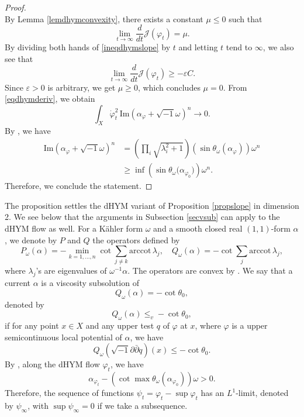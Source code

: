 \documentclass{amsart}
\numberwithin{equation}{section}
\theoremstyle{plain}
\theoremstyle{definition}
\theoremstyle{remark}
\newcommand{\delb}{\sqrt{-1}\partial\bar{\partial}}
\begin{document}
\begin{proof}
\begin{equation}
    \end{equation}
    By Lemma \ref{lemdhymconvexity}, there exists a constant $\mu\le0$ such that
    $$\lim_{t\rightarrow\infty}\frac{d}{dt}\mathcal{J}(\varphi_t)=\mu.$$
    By dividing both hands of \eqref{ineqdhymslope} by $t$ and letting $t$ tend to $\infty$, we also see that
    $$\lim_{t\rightarrow\infty}\frac{d}{dt}\mathcal{J}(\varphi_t)\ge - \varepsilon C.$$
    Since $\varepsilon>0$ is arbitrary, we get $\mu\ge0$, which concludes $\mu=0$. From \eqref{eqdhymderiv}, we obtain
    $$\int_X \dot{\varphi}_t^2 \, \mathrm{Im}(\alpha_\varphi+\sqrt{-1}\omega)^n \rightarrow0.$$
    By \cite[Lemma 3.2]{FYZ}, we have
    \begin{align*}
        \mathrm{Im}(\alpha_\varphi+\sqrt{-1}\omega)^n
        &=\left(\prod_i\sqrt{\lambda_i^2+1}\right)\left(\sin{\theta_\omega(\alpha_\varphi)}\right)\omega^n\\
        &\ge \inf\left(\sin{\theta_\omega(\alpha_{\varphi_0}})\right) \omega^n.
    \end{align*}    
    Therefore, we conclude the statement.
\end{proof}

The proposition settles the dHYM variant of Proposition \ref{propslope} in dimension 2. We see below that the arguments in Subsection \ref{secvsub} can apply to the dHYM flow as well. 
For a K{\"a}hler form $\omega$ and a smooth closed real $(1,1)$-form $\alpha$, we denote by $P$ and $Q$ the operators defined by
$$P_\omega(\alpha)=-\min_{k=1,\dots,n}\cot{\sum_{j\neq k}\mathrm{arccot}\, {\lambda_j}},\quad Q_\omega(\alpha)=-\cot{\sum_j \mathrm{arccot}\, {\lambda_j}},$$
where $\lambda_j$'s are eigenvalues of $\omega^{-1}\alpha$. The operators are convex by \cite[Lemma 5.6]{GChen}.
We say that a current $\alpha$ is a viscosity subsolution of
$$Q_\omega(\alpha)=-\cot{\theta_0},$$
denoted by
$$Q_\omega(\alpha)\le_v -\cot{\theta_0},$$
if for any point $x\in X$ and any upper test $q$ of $\varphi$ at $x$, where $\varphi$ is a upper semicontinuous local potential of $\alpha$, we have
\begin{equation*}
    Q_\omega(\delb q)(x)\le-\cot{\theta_0}.
\end{equation*}
By \cite[Lemma 3.2]{FYZ}, along the dHYM flow $\varphi_t$, we have
\begin{equation}\label{eqpsh}
    \alpha_{\varphi_t}-\left(\cot{\max \theta_\omega(\alpha_{\varphi_0})}\right)\omega>0.
\end{equation}
Therefore, the sequence of functions $\psi_t=\varphi_t-\sup\varphi_t$ has an $L^1$-limit, denoted by $\psi_\infty$, with $\sup \psi_\infty=0$ if we take a subsequence. 
\end{document}
